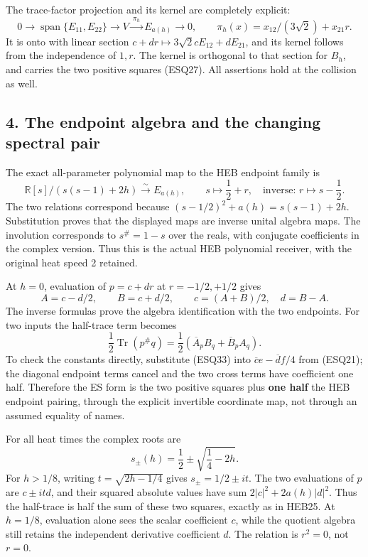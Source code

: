 \documentclass[
  10pt,
  a4paper,
]{article}
\begin{document}
The trace-factor projection and its kernel are completely explicit: \[
0\longrightarrow\operatorname{span}\{E_{11},E_{22}\}
\longrightarrow V\xrightarrow{\ \pi_h\ }E_{a(h)}
\longrightarrow0,
\qquad
\pi_h(x)=x_{12}/(3\sqrt2)+x_{21}r.
\tag{ESQ31}
\] It is onto with linear section \(c+dr\mapsto3\sqrt2cE_{12}+dE_{21}\),
and its kernel follows from the independence of \(1,r\). The kernel is
orthogonal to that section for \(B_h\), and carries the two positive
squares (ESQ27). All assertions hold at the collision as well.

\subsection{4. The endpoint algebra and the changing spectral
pair}\label{the-endpoint-algebra-and-the-changing-spectral-pair}

The exact all-parameter polynomial map to the HEB endpoint family is \[
\mathbb R[s]/(s(s-1)+2h)\xrightarrow{\sim}E_{a(h)},
\qquad s\longmapsto\frac12+r,
\quad\text{inverse: }r\longmapsto s-\frac12.
\tag{ESQ32}
\] The two relations correspond because \((s-1/2)^2+a(h)=s(s-1)+2h\).
Substitution proves that the displayed maps are inverse unital algebra
maps. The involution corresponds to \(s^\#=1-s\) over the reals, with
conjugate coefficients in the complex version. Thus this is the actual
HEB polynomial receiver, with the original heat speed 2 retained.

At \(h=0\), evaluation of \(p=c+dr\) at \(r=-1/2,+1/2\) gives \[
A=c-d/2,\qquad B=c+d/2,
\qquad
c=(A+B)/2,\quad d=B-A.
\tag{ESQ33}
\] The inverse formulas prove the algebra identification with the two
endpoints. For two inputs the half-trace term becomes \[
\frac12\operatorname{Tr}(p^\#q)
=\frac12(\overline A_p B_q+\overline B_p A_q).
\tag{ESQ34}
\] To check the constants directly, substitute (ESQ33) into
\(\overline c e-\overline d f/4\) from (ESQ21); the diagonal endpoint
terms cancel and the two cross terms have coefficient one half.
Therefore the ES form is the two positive squares plus \textbf{one half}
the HEB endpoint pairing, through the explicit invertible coordinate
map, not through an assumed equality of names.

For all heat times the complex roots are \[
s_\pm(h)=\frac12\pm\sqrt{\frac14-2h}.
\tag{ESQ35}
\] For \(h>1/8\), writing \(t=\sqrt{2h-1/4}\) gives \(s_\pm=1/2\pm it\).
The two evaluations of \(p\) are \(c\pm itd\), and their squared
absolute values have sum \(2|c|^2+2a(h)|d|^2\). Thus the half-trace is
half the sum of these two squares, exactly as in HEB25. At \(h=1/8\),
evaluation alone sees the scalar coefficient \(c\), while the quotient
algebra still retains the independent derivative coefficient \(d\). The
relation is \(r^2=0\), not \(r=0\).
\end{document}
